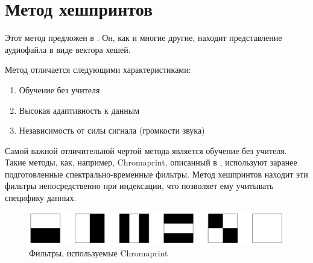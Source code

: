 \section{Метод хешпринтов}
Этот метод предложен в \cite{tsai}. Он, как и многие другие, находит представление
аудиофайла в виде вектора хешей.

Метод отличается следующими характеристиками:
\begin{enumerate}[label=\arabic*.]
    \item Обучение без учителя
    \item Высокая адаптивность к данным
    \item Независимость от силы сигнала (громкости звука)
\end{enumerate}

Самой важной отличительной чертой метода является обучение без учителя.
Такие методы, как, например, Chromaprint, описанный в \cite{chromaprint}, используют
заранее подготовленные спектрально-временные фильтры.
Метод хешпринтов находит эти фильтры непосредственно при индексации, что позволяет
ему учитывать специфику данных.
\begin{figure}[H]
    \begin{center}
        \includegraphics[scale=0.3]{inc/img/chroma.png}
        \caption{Фильтры, используемые Chromaprint}
    \end{center}
\end{figure}

